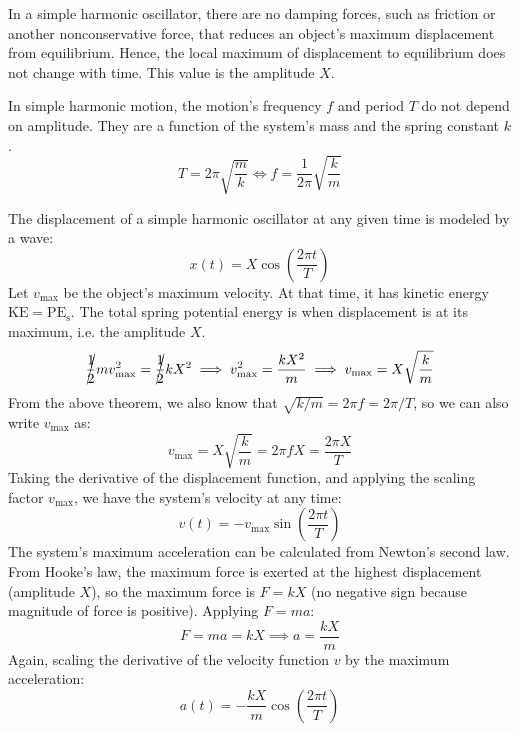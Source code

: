 \documentclass{article}
\newcommand{\theorem}[2]{\begin{tcolorbox}[title={#1},colback=blue!5!white,colframe=blue!75!black,parbox=false] #2 \end{tcolorbox}}
\begin{document}
In a simple harmonic oscillator, there are no damping forces, such as friction or another nonconservative force, that reduces an object's maximum displacement from equilibrium. Hence, the local maximum of displacement to equilibrium does not change with time. This value is the amplitude $X$.

\theorem{Period and frequency of a simple harmonic oscillator}{In simple harmonic motion, the motion's frequency $f$ and period $T$ do not depend on amplitude. They are a function of the system's mass and the spring constant $k$.
\begin{equation*}
	T=2\pi \sqrt{\frac mk}
	\iff f=\frac{1}{2\pi} \sqrt{\frac km}
\end{equation*}}

The displacement of a simple harmonic oscillator at any given time is modeled by a wave:
\begin{equation*}
	x(t)=X\cos \left( \frac{2\pi t}{T} \right)
\end{equation*}
Let $v_\text{max}$ be the object's maximum velocity. At that time, it has kinetic energy $\text{KE}=\text{PE}_\text{s}$. The total spring potential energy is when displacement is at its maximum, i.e. the amplitude $X$.
\begin{equation*}
	\cancel{\frac12}mv_\text{max}^2=\cancel{\frac12}kX^2
	\implies v_\text{max}^2=\frac{kX^2}{m}
	\implies v_\text{max}=X \sqrt{\frac km}
\end{equation*}
From the above theorem, we also know that $\sqrt{k/m}=2\pi f=2\pi/T$, so we can also write $v_\text{max}$ as:
\begin{equation*}
	v_\text{max}=X \sqrt{\frac km}=2\pi f X=\frac{2\pi X}{T}
\end{equation*}
Taking the derivative of the displacement function, and applying the scaling factor $v_\text{max}$, we have the system's velocity at any time:
\begin{equation*}
	v(t)=-v_\text{max} \sin\left(\frac{2\pi t}{T}\right)
\end{equation*}
The system's maximum acceleration can be calculated from Newton's second law. From Hooke's law, the maximum force is exerted at the highest displacement (amplitude $X$), so the maximum force is $F=kX$ (no negative sign because magnitude of force is positive). Applying $F=ma$:
\begin{equation*}
	F=ma=kX
	\implies a= \frac{kX}{m}
\end{equation*}
Again, scaling the derivative of the velocity function $v$ by the maximum acceleration:
\begin{equation*}
    a(t)=-\frac{kX}{m} \cos\left(\frac{2\pi t}{T}\right)
\end{equation*}
\end{document}
